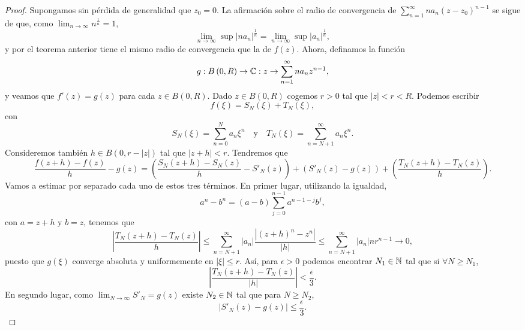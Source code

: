\begin{proof}
Supongamos sin pérdida de generalidad que $\displaystyle z_{0} = 0 $. La afirmación sobre el radio de convergencia de $\displaystyle \sum^{\infty}_{n = 1}na_{n}\left(z-z_{0}\right)^{n-1} $ se sigue de que, como $\displaystyle \lim_{n \to \infty}n^{\frac{1}{n}}=1 $,
\[\lim_{n \to \infty}\sup \left|na_{n}\right|^{\frac{1}{n}}=\lim_{n \to \infty}\sup \left|a_{n}\right|^{\frac{1}{n}} ,\]
y por el teorema anterior tiene el mismo radio de convergencia que la de $\displaystyle f\left(z\right) $. Ahora, definamos la función
\[g: B\left(0, R\right)\to \mathbb{C} : z \to \sum^{\infty}_{n = 1}na_{n}z^{n-1} ,\]
y veamos que $\displaystyle f'\left(z\right)=g\left(z\right) $ para cada $\displaystyle z \in B\left(0,R\right) $. Dado $\displaystyle z \in B\left(0, R\right) $ cogemos $\displaystyle r >0$ tal que $\displaystyle \left|z\right|<r<R $. Podemos escribir
\[f\left(\xi\right)=S_{N}\left(\xi\right) + T_{N}\left(\xi\right) ,\]
con
\[S_{N}\left(\xi\right)=\sum^{N}_{n = 0}a_{n}\xi^{n} \quad \text{y} \quad T_{N}\left(\xi\right)=\sum^{\infty}_{n = N + 1}a_{n}\xi^{n} .\]
Consideremos también $\displaystyle h \in B\left(0, r- \left|z\right|\right) $ tal que $\displaystyle \left|z + h\right|<r $. Tendremos que
\[\frac{f\left(z + h\right)-f\left(z\right)}{h}-g\left(z\right)=\left(\frac{S_{N}\left(z + h\right)-S_{N}\left(z\right)}{h}-S'_{N}\left(z\right)\right)+\left(S'_{N}\left(z\right)-g\left(z\right)\right)+\left(\frac{T_{N}\left(z + h\right)-T_{N}\left(z\right)}{h}\right) .\]
Vamos a estimar por separado cada uno de estos tres términos. En primer lugar, utilizando la igualdad,
\[a^{n}-b^{n}=\left(a-b\right)\sum^{n-1}_{j = 0}a^{n-1-j}b^{j} ,\]
con $\displaystyle a = z + h $ y $\displaystyle b = z $, tenemos que 
\[ \left|\frac{T_{N}\left(z + h\right)-T_{N}\left(z\right)}{h}\right|\leq \sum^{\infty}_{n = N + 1} \left|a_{n}\right| \frac{ \left|\left(z + h\right)^{n}-z^{n}\right|}{ \left|h\right|} \leq \sum^{\infty}_{n = N + 1} \left|a_{n}\right|nr^{n-1} \to 0 ,\]
puesto que $\displaystyle g\left(\xi\right) $ converge absoluta y uniformemente en $\displaystyle \left|\xi\right|\leq r $. Así, para $\displaystyle \epsilon > 0 $ podemos encontrar $\displaystyle N_{1} \in \mathbb{N} $ tal que si $\displaystyle \forall N \geq N_{1} $,
\[ \left|\frac{T_{N}\left(z+h\right)-T_{N}\left(z\right)}{ \left|h\right|}\right| < \frac{\epsilon }{3} .\]
En segundo lugar, como $\displaystyle \lim_{N \to \infty}S'_{N}=g\left(z\right) $ existe $\displaystyle N_{2} \in \mathbb{N} $ tal que para $\displaystyle N \geq N_{2} $,
\[ \left|S'_{N}\left(z\right)-g\left(z\right)\right|\leq \frac{\epsilon }{3} .\]

\end{proof}
